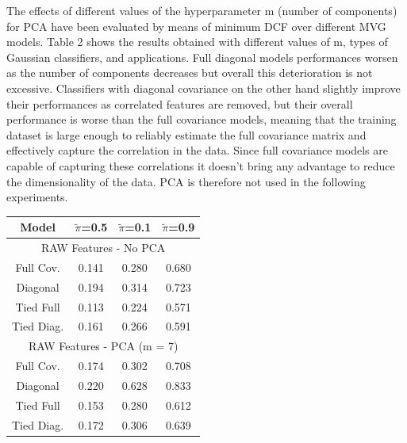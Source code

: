 \documentclass[12pt,a4paper]{article}
\begin{document}
\clearpage

\begin{multicols}{2}
    {
        \noindent
        \begin{addmargin}[0em]{1em}
            The effects of different values of the hyperparameter m (number of components) for PCA have been evaluated by means of minimum DCF over different MVG models.
            Table 2 shows the results obtained with different values of m, types of Gaussian classifiers, and applications.
            Full diagonal models performances worsen as the number of components decreases but overall this deterioration is not excessive.
            Classifiers with diagonal covariance on the other hand slightly improve their performances as correlated features are removed, but their overall performance is worse than the full covariance models, meaning that the training dataset is large enough to reliably estimate the full covariance matrix and effectively capture the correlation in the data.
            Since full covariance models are capable of capturing these correlations it doesn't bring any advantage to reduce the dimensionality of the data. PCA is therefore not used in the following experiments.
        \end{addmargin}
    }
    {
        \noindent
        \renewcommand{\arraystretch}{1.2}
        \begin{tabular}{cccc}

            Model      & \(\tilde{\pi}\)=0.5  & \(\tilde{\pi}\)=0.1   & \(\tilde{\pi}\)=0.9   \\ [0.5ex]

            \hline
            \multicolumn{4}{c}{RAW Features - No PCA}                                         \\
            \hline
            Full Cov.  & 0.141                & 0.280                 & 0.680                 \\
            Diagonal   & 0.194                & 0.314                 & 0.723                 \\
            Tied Full  & {\color{red} 0.113 } & {\color{blue} 0.224 } & {\color{blue} 0.571 } \\
            Tied Diag. & 0.161                & 0.266                 & 0.591                 \\

            \hline
            \multicolumn{4}{c}{RAW Features - PCA (m = 7)}                                    \\
            \hline
            Full Cov.  & 0.174                & 0.302                 & 0.708                 \\
            Diagonal   & 0.220                & 0.628                 & 0.833                 \\
            Tied Full  & {\color{red} 0.153 } & {\color{blue} 0.280 } & {\color{blue} 0.612 } \\
            Tied Diag. & 0.172                & 0.306                 & 0.639                 \\


\end{tabular}}
\end{multicols}
\end{document}
